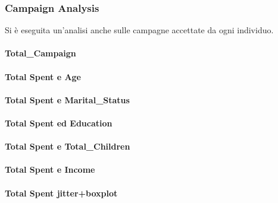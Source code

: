 \documentclass[letterpaper,11pt]{article}
\begin{document}
\newpage

\subsubsection{Campaign Analysis}
Si è eseguita un'analisi anche sulle campagne accettate da ogni individuo. 

\paragraph{Total\_Campaign}


\paragraph{Total Spent e Age}

\paragraph{Total Spent e Marital\_Status}

\paragraph{Total Spent ed Education}

\paragraph{Total Spent e Total\_Children}

\paragraph{Total Spent e Income}

\paragraph{Total Spent jitter+boxplot}

\newpage
\end{document}
